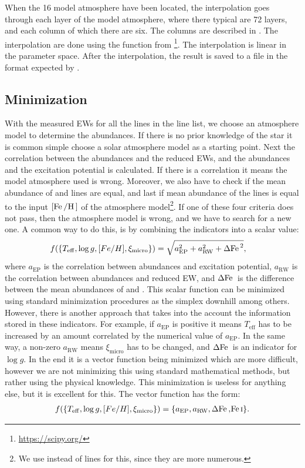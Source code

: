 When the 16 model atmosphere have been located, the interpolation goes through
each layer of the model atmosphere, where there typical are 72 layers, and each
column of which there are six. The columns are described in
. The interpolation are done using the
 function from \footnote{\url{https://scipy.org/}}.
The interpolation is linear in the parameter space. After the interpolation, the
result is saved to a file in the format expected by \MOOG.






\subsection{Minimization}

With the measured EWs for all the lines in the line list, we choose an
atmosphere model to determine the abundances. If there is no prior knowledge of
the star it is common simple choose a solar atmosphere model as a starting
point. Next the correlation between the abundances and the reduced EWs, and the
abundances and the excitation potential is calculated. If there is a correlation
it means the model atmosphere used is wrong. Moreover, we also have to check if
the mean abundance of  and  lines are equal, and last if
mean abundance of the  lines is equal to the input
$[\ion{Fe}/\ion{H}]$ of the atmosphere model\footnote{We use  instead
of  lines for this, since they are more numerous.}. If one of these
four criteria does not pass, then the atmosphere model is wrong, and we have to
search for a new one. A common way to do this, is by combining the indicators
into a scalar value:
\begin{align}
  f(\{T_\mathrm{eff}, \log g, [Fe/H], \xi_\mathrm{micro}\}) &= \sqrt{a_\mathrm{EP}^2 + a_\mathrm{RW}^2 + \Delta\ion{Fe}{}^2},
\end{align}
where $a_\mathrm{EP}$ is the correlation between abundances and excitation
potential, $a_\mathrm{RW}$ is the correlation between abundances and reduced EW,
and $\Delta\ion{Fe}{}$ is the difference between the mean abundances of
 and . This scalar function can be minimized using
standard minimization procedures as the simplex downhill among others. However,
there is another approach that takes into the account the information stored in
these indicators. For example, if $a_\mathrm{EP}$ is positive it means
$T_\mathrm{eff}$ has to be increased by an amount correlated by the numerical
value of $a_\mathrm{EP}$. In the same way, a non-zero $a_\mathrm{RW}$ means
$\xi_\mathrm{micro}$ has to be changed, and $\Delta\ion{Fe}{}$ is an indicator
for $\log g$. In the end it is a vector function being minimized which are more
difficult, however we are not minimizing this using standard mathematical
methods, but rather using the physical knowledge. This minimization is useless
for anything else, but it is excellent for this.
The vector function has the form:
\begin{align}
    f(\{T_\mathrm{eff}, \log g, [Fe/H], \xi_\mathrm{micro}\}) = \{a_\mathrm{EP}, a_\mathrm{RW}, \Delta\ion{Fe}, \ion{Fe}{I}\}.
\end{align}

